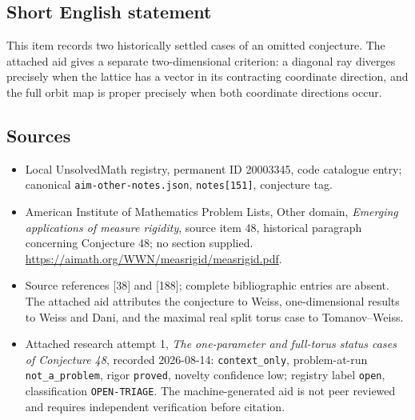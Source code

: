 \documentclass[11pt]{article}
\begin{document}
\subsection{Short English statement}
This item records two historically settled cases of an omitted conjecture. The attached aid gives a separate two-dimensional criterion: a diagonal ray diverges precisely when the lattice has a vector in its contracting coordinate direction, and the full orbit map is proper precisely when both coordinate directions occur.
\subsection{Sources}
\begin{itemize}\item Local UnsolvedMath registry, permanent ID 20003345, code catalogue entry; canonical \texttt{aim-other-notes.json}, \texttt{notes[151]}, conjecture tag.\item American Institute of Mathematics Problem Lists, Other domain, \emph{Emerging applications of measure rigidity}, source item 48, historical paragraph concerning Conjecture 48; no section supplied. \url{https://aimath.org/WWN/measrigid/measrigid.pdf}.\item Source references [38] and [188]; complete bibliographic entries are absent. The attached aid attributes the conjecture to Weiss, one-dimensional results to Weiss and Dani, and the maximal real split torus case to Tomanov--Weiss.\item Attached research attempt 1, \emph{The one-parameter and full-torus status cases of Conjecture 48}, recorded 2026-08-14: \texttt{context\_only}, problem-at-run \texttt{not\_a\_problem}, rigor \texttt{proved}, novelty confidence low; registry label \texttt{open}, classification \texttt{OPEN-TRIAGE}. The machine-generated aid is not peer reviewed and requires independent verification before citation.\end{itemize}
\end{document}
